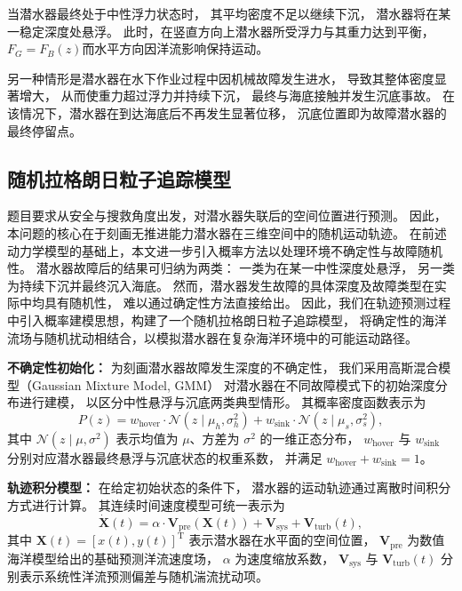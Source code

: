 \documentclass{mcmthesis}
\begin{document}
当潜水器最终处于中性浮力状态时，
其平均密度不足以继续下沉，
潜水器将在某一稳定深度处悬浮。
此时，在竖直方向上潜水器所受浮力与其重力达到平衡，
$F_G=F_B(z)$而水平方向因洋流影响保持运动。

另一种情形是潜水器在水下作业过程中因机械故障发生进水，
导致其整体密度显著增大，
从而使重力超过浮力并持续下沉，
最终与海底接触并发生沉底事故。
在该情况下，潜水器在到达海底后不再发生显著位移，
沉底位置即为故障潜水器的最终停留点。
\subsection{随机拉格朗日粒子追踪模型}
题目要求从安全与搜救角度出发，对潜水器失联后的空间位置进行预测。
因此，本问题的核心在于刻画无推进能力潜水器在三维空间中的随机运动轨迹。
在前述动力学模型的基础上，本文进一步引入概率方法以处理环境不确定性与故障随机性。
潜水器故障后的结果可归纳为两类：
一类为在某一中性深度处悬浮，
另一类为持续下沉并最终沉入海底。
然而，潜水器发生故障的具体深度及故障类型在实际中均具有随机性，
难以通过确定性方法直接给出。
因此，我们在轨迹预测过程中引入概率建模思想，构建了一个随机拉格朗日粒子追踪模型，
将确定性的海洋流场与随机扰动相结合，以模拟潜水器在复杂海洋环境中的可能运动路径。

\textbf{不确定性初始化：}
为刻画潜水器故障发生深度的不确定性，
我们采用高斯混合模型（Gaussian Mixture Model, GMM）
对潜水器在不同故障模式下的初始深度分布进行建模，
以区分中性悬浮与沉底两类典型情形。
其概率密度函数表示为
\begin{equation}
P(z)
=
w_{\mathrm{hover}}
\cdot
\mathcal{N}\!\left(z \mid \mu_h, \sigma_h^2 \right)
+
w_{\mathrm{sink}}
\cdot
\mathcal{N}\!\left(z \mid \mu_s, \sigma_s^2 \right),
\end{equation}
其中
$\mathcal{N}(z \mid \mu, \sigma^2)$ 表示均值为 $\mu$、方差为 $\sigma^2$ 的一维正态分布，
$w_{\mathrm{hover}}$ 与 $w_{\mathrm{sink}}$ 分别对应潜水器最终悬浮与沉底状态的权重系数，
并满足
$w_{\mathrm{hover}} + w_{\mathrm{sink}} = 1$。

\vspace{0.5em}
\textbf{轨迹积分模型：}
在给定初始状态的条件下，
潜水器的运动轨迹通过离散时间积分方式进行计算。
其连续时间速度模型可统一表示为
\begin{equation}
\dot{\mathbf{X}}(t)
=
\alpha \cdot \mathbf{V}_{\mathrm{pre}}(\mathbf{X}(t))
+
\mathbf{V}_{\mathrm{sys}}
+
\mathbf{V}_{\mathrm{turb}}(t),
\end{equation}
其中
$\mathbf{X}(t) = [x(t),y(t)]^{\mathrm{T}}$ 表示潜水器在水平面的空间位置，
$\mathbf{V}_{\mathrm{pre}}$ 为数值海洋模型给出的基础预测洋流速度场，
$\alpha$ 为速度缩放系数，
$\mathbf{V}_{\mathrm{sys}}$ 与 $\mathbf{V}_{\mathrm{turb}}(t)$
分别表示系统性洋流预测偏差与随机湍流扰动项。
\end{document}
